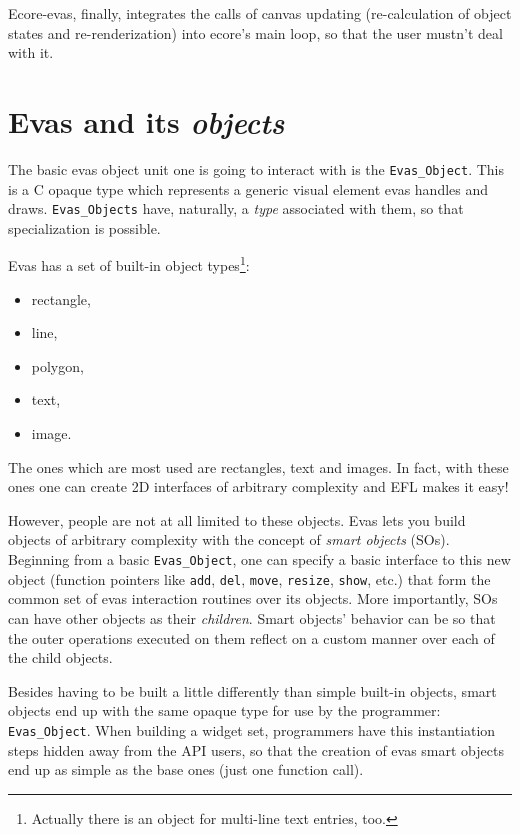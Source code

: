 \documentclass[a4paper]{profusion}
\begin{document}
Ecore-evas, finally, integrates the calls of canvas updating
(re-calculation of object states and re-renderization) into ecore's
main loop, so that the user mustn't deal with it.

\section{Evas and its \emph{objects}}

The basic evas object unit one is going to interact with is the
\texttt{Evas\_Object}. This is a C opaque type which represents a
generic visual element evas handles and draws. \texttt{Evas\_Objects}
have, naturally, a \emph{type} associated with them, so that
specialization is possible.

Evas has a set of built-in object types\footnote{Actually there is an
  object for multi-line text entries, too.}:
\begin{itemize}
\item rectangle,
\item line,
\item polygon,
\item text,
\item image.
\end{itemize}

The ones which are most used are rectangles, text and images. In fact,
with these ones one can create 2D interfaces of arbitrary complexity
and EFL makes it easy!


However, people are not at all limited to these objects. Evas lets you
build objects of arbitrary complexity with the concept of \emph{smart
  objects} (SOs).  Beginning from a basic \texttt{Evas\_Object}, one
can specify a basic interface to this new object (function pointers
like \texttt{add}, \texttt{del}, \texttt{move}, \texttt{resize},
\texttt{show}, etc.) that form the common set of evas interaction
routines over its objects.  More importantly, SOs can have other
objects as their \emph{children}. Smart objects' behavior can be so
that the outer operations executed on them reflect on a custom manner
over each of the child objects.

Besides having to be built a little differently than simple built-in
objects, smart objects end up with the same opaque type for use by the
programmer: \texttt{Evas\_Object}. When building a widget set,
programmers have this instantiation steps hidden away from the API
users, so that the creation of evas smart objects end up as simple as
the base ones (just one function call).
\end{document}
